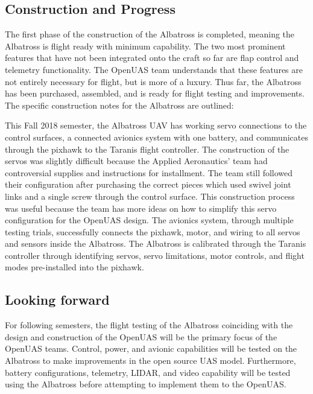 \documentclass{article}
\begin{document}
\subsection{Construction and Progress}
\noindent The first phase of the construction of the Albatross is completed, meaning the Albatross is flight ready with minimum capability. The two most prominent features that have not been integrated onto the craft so far are flap control and telemetry functionality. The OpenUAS team understands that these features are not entirely necessary for flight, but is more of a luxury. Thus far, the Albatross has been purchased, assembled, and is ready for flight testing and improvements. The specific construction notes for the Albatross are outlined: 

This Fall 2018 semester, the Albatross UAV has working servo connections to the control surfaces, a connected avionics system with one battery, and communicates through the pixhawk to the Taranis flight controller. The construction of the servos was slightly difficult because the Applied Aeronautics' team had controversial supplies and instructions for installment. The team still followed their configuration after purchasing the correct pieces which used swivel joint links and a single screw through the control surface. This construction process was useful because the team has more ideas on how to simplify this servo configuration for the OpenUAS design. The avionics system, through multiple testing trials, successfully connects the pixhawk, motor, and wiring to all servos and sensors inside the Albatross. The Albatross is calibrated through the Taranis controller through identifying servos, servo limitations, motor controls, and flight modes pre-installed into the pixhawk. 

 
\subsection{Looking forward}
\noindent For following semesters, the flight testing of the Albatross coinciding with the design and construction of the OpenUAS will be the primary focus of the OpenUAS teams. Control, power, and avionic capabilities will be tested on the Albatross to make improvements in the open source UAS model. Furthermore, battery configurations, telemetry, LIDAR, and video capability will be tested using the Albatross before attempting to implement them to the OpenUAS. \\


\end{document}
